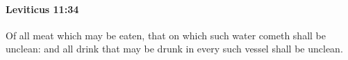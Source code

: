 
		\paragraph{Leviticus 11:34} %
			\label{LEVITICUS-11-34}

			Of all meat which may be eaten, that on which such water cometh shall be unclean: and all drink that may be drunk in every such vessel shall be unclean.


